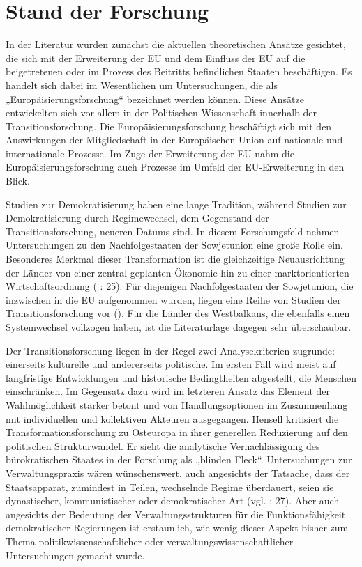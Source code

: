 \section{Stand der Forschung}
In der Literatur wurden zunächst die aktuellen theoretischen Ansätze gesichtet, die sich mit der Erweiterung der EU und dem Einfluss der EU auf die beigetretenen oder im Prozess des Beitritts befindlichen Staaten beschäftigen. Es handelt sich dabei im Wesentlichen um Untersuchungen, die als „Europäisierungsforschung“ bezeichnet werden können. Diese Ansätze entwickelten sich vor allem in der Politischen Wissenschaft innerhalb der Transitionsforschung. Die Europäisierungsforschung beschäftigt sich mit den Auswirkungen der Mitgliedschaft in der Europäischen Union auf nationale und internationale Prozesse. Im Zuge der Erweiterung der EU nahm die Europäisierungsforschung auch Prozesse im Umfeld der EU-Erweiterung in den Blick.\par
Studien zur Demokratisierung haben eine lange Tradition, während Studien zur Demokratisierung durch Regimewechsel, dem Gegenstand der Transitionsforschung, neueren Datums sind. In diesem Forschungsfeld nehmen Untersuchungen zu den Nachfolgestaaten der Sowjetunion eine große Rolle ein. Besonderes Merkmal dieser Transformation ist die gleichzeitige Neuausrichtung der Länder von einer zentral geplanten Ökonomie hin zu einer marktorientierten Wirtschaftsordnung (\cite{diaman} : 25). Für diejenigen Nachfolgestaaten der Sowjetunion, die inzwischen in die EU aufgenommen wurden, liegen eine Reihe von Studien der Transitionsforschung vor (\cite{dimit02,linden,grab05,kneuer07}). Für die Länder des Westbalkans, die ebenfalls einen Systemwechsel vollzogen haben, ist die Literaturlage dagegen sehr überschaubar. 
\par
Der Transitionsforschung liegen in der Regel zwei Analysekriterien zugrunde: einerseits kulturelle und andererseits politische. Im ersten Fall wird meist auf langfristige Entwicklungen und historische Bedingtheiten abgestellt, die Menschen einschränken. Im Gegensatz dazu wird im letzteren Ansatz das Element der Wahlmöglichkeit stärker betont und von Handlungsoptionen im Zusammenhang mit individuellen und kollektiven Akteuren ausgegangen. Hensell kritisiert die Transformationsforschung zu Osteuropa in ihrer generellen Reduzierung auf den politischen Strukturwandel. Er sieht die analytische Vernachlässigung des bürokratischen Staates in der Forschung als „blinden Fleck“. Untersuchungen zur Verwaltungspraxis wären wünschenswert, auch angesichts der Tatsache, dass der Staatsapparat, zumindest in Teilen, wechselnde Regime überdauert, seien sie dynastischer, kommunistischer oder demokratischer Art (vgl. \cite{hens09} : 27). Aber auch angesichts der Bedeutung der Verwaltungsstrukturen für die Funktionsfähigkeit demokratischer Regierungen ist erstaunlich, wie wenig dieser Aspekt bisher zum Thema politikwissenschaftlicher oder verwaltungswissenschaftlicher Untersuchungen gemacht wurde.
